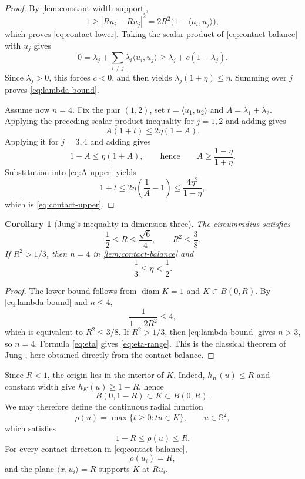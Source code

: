 \documentclass[11pt,reqno]{amsart}
\numberwithin{equation}{section}
\newtheorem{corollary}[theorem]{Corollary}
\theoremstyle{definition}
\theoremstyle{remark}
\newcommand{\Sph}{\mathbb{S}^{2}}
\newcommand{\diam}{\operatorname{diam}}
\newcommand{\ip}[2]{\langle #1,#2\rangle}
\begin{document}
\begin{proof}
By \cref{lem:constant-width-support},
\[
 1\geq |Ru_i-Ru_j|^{2}=2R^{2}\bigl(1-\ip{u_i}{u_j}\bigr),
\]
which proves \eqref{eq:contact-lower}. Taking the scalar product of \eqref{eq:contact-balance} with $u_j$ gives
\[
 0=\lambda_j+\sum_{i\neq j}\lambda_i\ip{u_i}{u_j}
 \geq \lambda_j+c(1-\lambda_j).
\]
Since $\lambda_j>0$, this forces $c<0$, and then yields
$\lambda_j(1+\eta)\leq\eta$. Summing over $j$ proves \eqref{eq:lambda-bound}.

Assume now $n=4$. Fix the pair $(1,2)$, set $t=\ip{u_1}{u_2}$ and $A=\lambda_1+\lambda_2$. Applying the preceding scalar-product inequality for $j=1,2$ and adding gives
\begin{equation}\label{eq:A-upper}
 A(1+t)\leq 2\eta(1-A).
\end{equation}
Applying it for $j=3,4$ and adding gives
\[
 1-A\leq\eta(1+A),
 \qquad\text{hence}\qquad
 A\geq\frac{1-\eta}{1+\eta}.
\]
Substitution into \eqref{eq:A-upper} yields
\[
 1+t\leq2\eta\left(\frac1A-1\right)
 \leq\frac{4\eta^{2}}{1-\eta},
\]
which is \eqref{eq:contact-upper}.
\end{proof}

\begin{corollary}[Jung's inequality in dimension three]\label{cor:Jung}
The circumradius satisfies
\begin{equation}\label{eq:Jung}
 \frac12\leq R\leq \frac{\sqrt6}{4},
 \qquad
 R^{2}\leq\frac38.
\end{equation}
If $R^{2}>1/3$, then $n=4$ in \cref{lem:contact-balance} and
\begin{equation}\label{eq:eta-range}
 \frac13\leq\eta<\frac12.
\end{equation}
\end{corollary}

\begin{proof}
The lower bound follows from $\diam K=1$ and $K\subset B(0,R)$. By \eqref{eq:lambda-bound} and $n\leq4$,
\[
 \frac{1}{1-2R^{2}}\leq4,
\]
which is equivalent to $R^{2}\leq3/8$. If $R^{2}>1/3$, then \eqref{eq:lambda-bound} gives $n>3$, so $n=4$. Formula \eqref{eq:eta} gives \eqref{eq:eta-range}. This is the classical theorem of Jung \cite{Jung1901}, here obtained directly from the contact balance.
\end{proof}

Since $R<1$, the origin lies in the interior of $K$. Indeed, $h_K(u)\leq R$ and constant width give $h_K(u)\geq1-R$, hence
\begin{equation}\label{eq:inner-outer-balls}
 B(0,1-R)\subset K\subset B(0,R).
\end{equation}
We may therefore define the continuous radial function
\[
 \rho(u)=\max\{t\geq0:tu\in K\},\qquad u\in\Sph,
\]
which satisfies
\begin{equation}\label{eq:rho-range}
 1-R\leq\rho(u)\leq R.
\end{equation}
For every contact direction in \eqref{eq:contact-balance},
\begin{equation}\label{eq:rho-contact}
 \rho(u_i)=R,
\end{equation}
and the plane $\ip{x}{u_i}=R$ supports $K$ at $Ru_i$.
\end{document}
